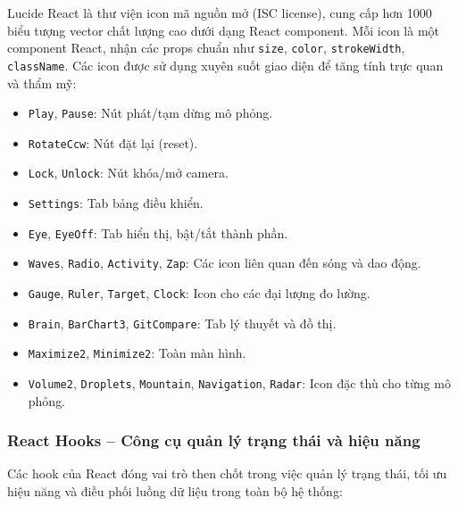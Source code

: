 Lucide React là thư viện icon mã nguồn mở (ISC license), cung cấp hơn 1000 biểu tượng vector chất lượng cao dưới dạng React component. Mỗi icon là một component React, nhận các props chuẩn như \texttt{size}, \texttt{color}, \texttt{strokeWidth}, \texttt{className}. Các icon được sử dụng xuyên suốt giao diện để tăng tính trực quan và thẩm mỹ:

\begin{itemize}
    \item \texttt{Play}, \texttt{Pause}: Nút phát/tạm dừng mô phỏng.
    \item \texttt{RotateCcw}: Nút đặt lại (reset).
    \item \texttt{Lock}, \texttt{Unlock}: Nút khóa/mở camera.
    \item \texttt{Settings}: Tab bảng điều khiển.
    \item \texttt{Eye}, \texttt{EyeOff}: Tab hiển thị, bật/tắt thành phần.
    \item \texttt{Waves}, \texttt{Radio}, \texttt{Activity}, \texttt{Zap}: Các icon liên quan đến sóng và dao động.
    \item \texttt{Gauge}, \texttt{Ruler}, \texttt{Target}, \texttt{Clock}: Icon cho các đại lượng đo lường.
    \item \texttt{Brain}, \texttt{BarChart3}, \texttt{GitCompare}: Tab lý thuyết và đồ thị.
    \item \texttt{Maximize2}, \texttt{Minimize2}: Toàn màn hình.
    \item \texttt{Volume2}, \texttt{Droplets}, \texttt{Mountain}, \texttt{Navigation}, \texttt{Radar}: Icon đặc thù cho từng mô phỏng.
\end{itemize}

\subsubsection{React Hooks – Công cụ quản lý trạng thái và hiệu năng}

Các hook của React đóng vai trò then chốt trong việc quản lý trạng thái, tối ưu hiệu năng và điều phối luồng dữ liệu trong toàn bộ hệ thống:

